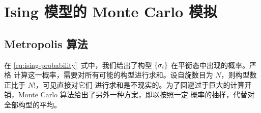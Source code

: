 %

\section{Ising 模型的 Monte Carlo 模拟}

\subsection{Metropolis 算法}

在 \eqref{eq:ising-probability}~式中，我们给出了构型 ${\{\sigma_i\}}$ 在平衡态中出现的概率。严格
计算这一概率，需要对所有可能的构型进行求和。设自旋数目为 $N$，则构型数正比于 $N!$，可见直接对它们
进行求和是不现实的。为了回避过于巨大的计算开销，Monte Carlo 算法给出了另外一种方案，即以按照一定
概率的抽样，代替对全部构型的平均。


